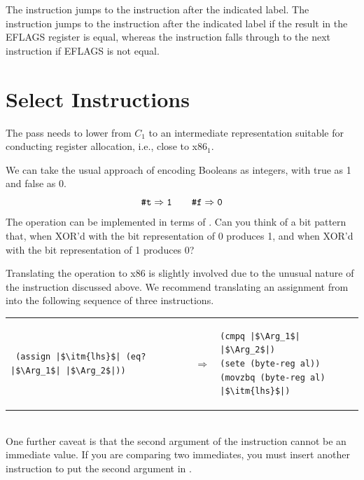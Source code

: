 \documentclass[11pt]{book}
\begin{document}
The  instruction jumps to the instruction after the indicated
label.  The  instruction jumps to the instruction after the
indicated label if the result in the EFLAGS register is equal, whereas
the  instruction falls through to the next instruction if
EFLAGS is not equal.

\section{Select Instructions}
\label{sec:select-r2}

The  pass needs to lower from $C_1$ to an
intermediate representation suitable for conducting register
allocation, i.e., close to x86$_1$. 

We can take the usual approach of encoding Booleans as integers, with
true as 1 and false as 0.
\[
\texttt{\#t} \Rightarrow \texttt{1}
\qquad
\texttt{\#f} \Rightarrow \texttt{0}
\]
The  operation can be implemented in terms of .
Can you think of a bit pattern that, when XOR'd with the bit
representation of 0 produces 1, and when XOR'd with the bit
representation of 1 produces 0?

Translating the  operation to x86 is slightly involved due
to the unusual nature of the  instruction discussed above.
We recommend translating an assignment from  into the
following sequence of three instructions. \\
\begin{tabular}{lll}
\begin{minipage}{0.4\textwidth}
\begin{lstlisting}
 (assign |$\itm{lhs}$| (eq? |$\Arg_1$| |$\Arg_2$|))
\end{lstlisting}
\end{minipage}
&
$\Rightarrow$
&
\begin{minipage}{0.4\textwidth}
\begin{lstlisting}
(cmpq |$\Arg_1$| |$\Arg_2$|)
(sete (byte-reg al))
(movzbq (byte-reg al) |$\itm{lhs}$|)
\end{lstlisting}
\end{minipage}
\end{tabular}  \\
One further caveat is that the second argument of the  instruction
cannot be an immediate value. If you are comparing two immediates, you must insert another  instruction to put the second argument in
.
\end{document}
